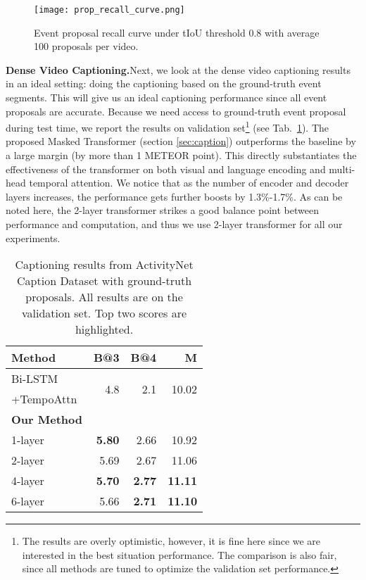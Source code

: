 \documentclass[10pt,twocolumn,letterpaper]{article}
\begin{document}
\begin{figure}[t]
\centering 
  \texttt{[image: prop\_recall\_curve.png]}
\vspace{-2pt}
       \caption{Event proposal recall curve under tIoU threshold 0.8 with average 100 proposals per video.}
    \vspace{-8pt}
\label{fig:prop_recall_curve}
\end{figure}

\noindent\textbf{Dense Video Captioning.}\quad Next, we look at the dense video captioning results in an ideal setting: doing the captioning based on the ground-truth event segments. This will give us an ideal captioning performance since all event proposals are accurate. Because we need access to ground-truth event proposal during test time, we report the results on validation set\footnote{The results are overly optimistic, however, it is fine here since we are interested in the best situation performance. The comparison is also fair, since all methods are tuned to optimize the validation set performance.} (see Tab.~\ref{tbl:result_gt_caption}).
The proposed Masked Transformer (section \ref{sec:caption}) outperforms the baseline by a large margin (by more than 1 METEOR point). This directly substantiates the effectiveness of the transformer on both visual and language encoding and multi-head temporal attention. We notice that as the number of encoder and decoder layers increases, the performance gets further boosts by 1.3\%-1.7\%. As can be noted here, the 2-layer transformer strikes a good balance point between performance and computation, and thus we use 2-layer transformer for all our experiments.

\begin{table}[t]
\centering
\caption{Captioning results from ActivityNet Caption Dataset with ground-truth proposals. All results are on the validation set. Top two scores are highlighted.}
\label{tbl:result_gt_caption}
    {\small
\begin{tabular}{lrrr}
\toprule
Method & B@3 & B@4 & M \\ \midrule



Bi-LSTM & \multirow{2}{*}{4.8} & \multirow{2}{*}{2.1} & \multirow{2}{*}{10.02} \\
+TempoAttn \\ \midrule
\textbf{Our Method} \\
1-layer & \textbf{5.80} & 2.66 & 10.92 \\ 2-layer & 5.69 & 2.67 & 11.06 \\ 4-layer & \textbf{5.70} & \textbf{2.77} & \textbf{11.11} \\ 6-layer & 5.66 & \textbf{2.71} & \textbf{11.10} \\ \bottomrule
\end{tabular}
    }
    \vspace{-10pt}
\end{table}
\end{document}
